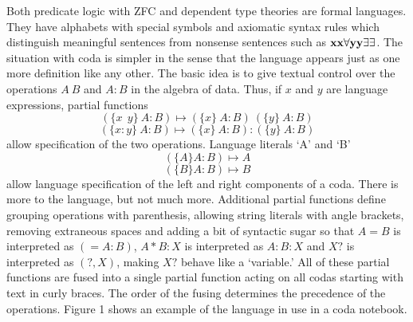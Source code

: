 \documentclass[11pt]{article}
\begin{document}
Both predicate logic with ZFC and dependent type theories are formal languages.  They have alphabets with special symbols
and axiomatic syntax rules which distinguish meaningful sentences from nonsense sentences such as ${\bf xx\forall yy\exists\exists}$.
The situation with coda is simpler in the sense that the language appears just as one more definition like any other.
The basic idea is to give textual control over the operations $A\ B$ and $A:B$ in the algebra of data.
Thus, if $x$ and $y$ are language expressions, partial functions
\begin{equation} \label{eqn}
( \{x\ \ y\} \ A : B ) \mapsto (\{x\}\ A : B)\ (\{y\}\ A : B)
\end{equation}
\begin{equation} \label{eqn}
( \{x : y\} \ A : B ) \mapsto (\{x\}\ A : B):(\{y\}\ A : B)
\end{equation}
allow specification of the two operations.  Language literals `A' and `B'
\begin{equation}\label{eqn}
(\{A\} A:B)\mapsto A
\end{equation}
\begin{equation}\label{eqn}
(\{B\} A:B)\mapsto B
\end{equation}
allow language specification of the left and right components of a coda.  There is more to the language, but not much more.  Additional partial functions
define grouping operations with parenthesis, allowing string literals with angle brackets, removing extraneous spaces and adding a bit of syntactic
sugar so that $A=B$ is interpreted as $(=A:B)$, $A*B:X$ is interpreted as $A:B:X$ and $X?$ is interpreted as $(?,X)$, making $X?$ behave like
a `variable.'  All of these partial functions are fused into a single partial function acting on all codas starting with text in curly braces.  The order of
the fusing determines the precedence of the operations.  Figure 1 shows an example of the language in use in a coda notebook\cite{github}.
\end{document}
